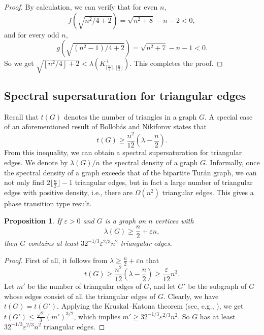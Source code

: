 \documentclass[11pt]{article}
\newtheorem{proposition}[theorem]{Proposition}
\begin{document}
\begin{proof}
By calculation, we can verify that for even $n$,
\[  f (\sqrt{{n^2}/{4 }+2} ) = \sqrt{n^2+8} -n -2<0, \]
and for every odd $n$,
\[  g (\sqrt{ {(n^2-1)}/{4} +2} ) = \sqrt{n^2+7} -n-1 <0. \]
So we get $\sqrt{\left\lfloor {n^2}/{4} \right\rfloor +2} < 
 \lambda (K_{ \lceil \frac{n}{2} \rceil, \lfloor \frac{n}{2} \rfloor}^+) $. This completes the proof.
\end{proof}





\subsection{Spectral supersaturation for triangular edges}

Recall that $t(G)$ denotes the number of triangles in a graph $G$. 
A special case of an aforementioned 
result of Bollob\'{a}s and Nikiforov \cite{BN2007jctb} 
states that 
\[  t(G) \ge \frac{n^2}{12}\left( \lambda -\frac{n}{2}\right). \]
From this inequality, we can obtain a spectral supersaturation for triangular edges. We denote by $\lambda (G)/n$ the spectral density of a graph $G$. 
Informally, once the spectral density of a graph exceeds that 
of the bipartite Tur\'{a}n graph, we can not only find $2\lfloor \frac{n}{2}\rfloor -1$ triangular edges, but in fact a large number of triangular edges with positive density, i.e., there are $\Omega(n^2)$ triangular edges.  
This gives a phase transition type result. 

\begin{proposition} \label{super-1}
If $\varepsilon >0$ and $G$ is a graph on $n$ 
vertices with 
\[  \lambda (G)\ge \frac{n}{2} + \varepsilon n, \]
then $G$ contains at least $32^{-1/3}\varepsilon^{2/3}n^2$ 
triangular edges. 
\end{proposition}


\begin{proof}
First of all, 
it follows from $\lambda \ge \frac{n}{2} + \varepsilon n$ 
that  
 \[  t(G) \ge \frac{n^2}{12}\left( \lambda -\frac{n}{2}\right) 
 \ge \frac{\varepsilon}{12}n^3. \]  
  Let $m'$ be the number of triangular edges of $G$,  
and  let $G'$ be the subgraph of $G$ whose edges consist of all the triangular edges of $G$.  Clearly, we have 
$t(G)=t(G')$. 
Applying the Kruskal--Katona theorem (see, e.g., \cite[page 305]{Bollobas78}), we get  
$ t(G') \le  \frac{\sqrt{2}}{3}(m')^{3/2}$, 
which implies  $m' \ge 32^{-1/3}\varepsilon^{2/3}n^2$. So 
$G$ has at least $32^{-1/3}\varepsilon^{2/3}n^2$ 
triangular edges. 
\end{proof}
\end{document}
